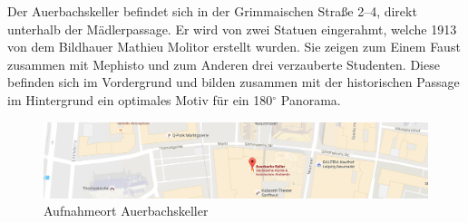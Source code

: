 \documentclass[liststotoc,bibtotoc,fontsize=14pt,]{scrreprt}
\begin{document}
	\bigskip
	Der Auerbachskeller befindet sich in der Grimmaischen Straße 2–4, direkt unterhalb der Mädlerpassage. Er wird von zwei Statuen eingerahmt, welche 1913 von dem Bildhauer Mathieu Molitor erstellt wurden. Sie zeigen zum Einem Faust zusammen mit Mephisto und zum Anderen drei verzauberte Studenten. Diese befinden sich im Vordergrund und bilden zusammen mit der historischen Passage im Hintergrund ein optimales Motiv für ein 180$^\circ$ Panorama.
	
	\begin{figure}[H]
		\includegraphics[width=\linewidth]{img/places/ak_map.jpg}
		\caption{Aufnahmeort Auerbachskeller}
		\label{img:ak_map}
	\end{figure}
\end{document}

